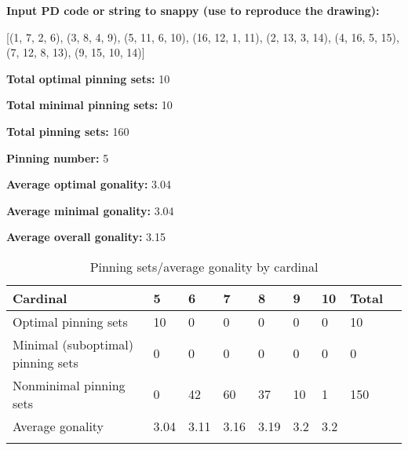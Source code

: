\documentclass{article}%
\begin{document}
\newpage

\begin{multicols}{2}
\noindent\textbf{Input PD code or string to snappy (use to reproduce the drawing):}

	[(1, 7, 2, 6), (3, 8, 4, 9), (5, 11, 6, 10), (16, 12, 1, 11), (2, 13, 3, 14), (4, 16, 5, 15), (7, 12, 8, 13), (9, 15, 10, 14)]


\columnbreak

\noindent\textbf{Total optimal pinning sets:} 10

\noindent\textbf{Total minimal pinning sets:} 10

\noindent\textbf{Total pinning sets:} 160

\noindent\textbf{Pinning number:} 5

\noindent\textbf{Average optimal gonality:} 3.04

\noindent\textbf{Average minimal gonality:} 3.04

\noindent\textbf{Average overall gonality:} 3.15


\end{multicols}

\begin{table}[ht]
	\caption{Pinning sets/average gonality by cardinal}
	\centering
	\renewcommand{\arraystretch}{1.5}
	\begin{tabularx}{\textwidth}{lXXXXXXXX}
		\toprule
			Cardinal & 5 & 6 & 7 & 8 & 9 & 10 & Total\\
			\hline
			Optimal pinning sets & 10 & 0 & 0 & 0 & 0 & 0 & 10 \\
			Minimal (suboptimal) pinning sets & 0 & 0 & 0 & 0 & 0 & 0 & 0 \\
			Nonminimal pinning sets & 0 & 42 & 60 & 37 & 10 & 1 & 150 \\
			Average gonality & 3.04 & 3.11 & 3.16 & 3.19 & 3.2 & 3.2 &  \\
		\bottomrule \\ 
	\end{tabularx}
\end{table}
\end{document}
